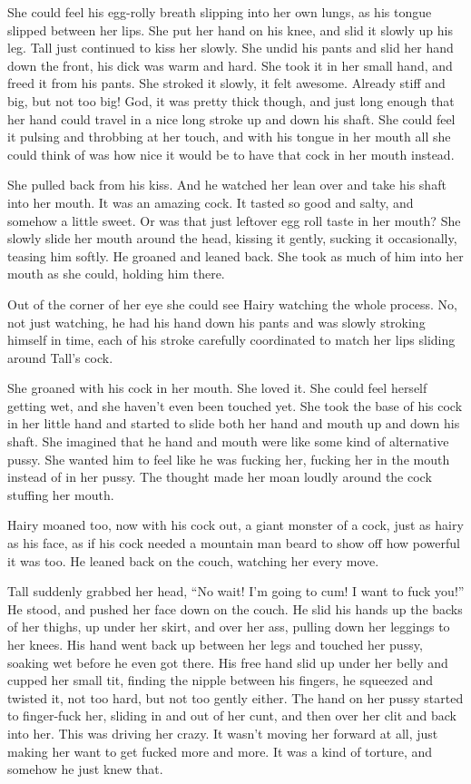 \documentclass[letterpaper]{article}
\begin{document}
\begin{multicols}{2}
She could feel his egg-rolly breath slipping into her own lungs, as his tongue slipped between her lips.
She put her hand on his knee, and slid it slowly up his leg.
Tall just continued to kiss her slowly.
She undid his pants and slid her hand down the front, his dick was warm and hard.
She took it in her small hand, and freed it from his pants.
She stroked it slowly, it felt awesome. Already stiff and big, but not too big!
God, it was pretty thick though, and just long enough that her hand could travel in a nice long stroke up and down his shaft.
She could feel it pulsing and throbbing at her touch, and with his tongue in her mouth all she could think of was how nice it would be to have that cock in her mouth instead.

She pulled back from his kiss.
And he watched her lean over and take his shaft into her mouth.
It was an amazing cock. It tasted so good and salty, and somehow a little sweet. Or was that just leftover egg roll taste in her mouth?
She slowly slide her mouth around the head, kissing it gently, sucking it occasionally, teasing him softly.
He groaned and leaned back.
She took as much of him into her mouth as she could, holding him there.

Out of the corner of her eye she could see Hairy watching the whole process.
No, not just watching, he had his hand down his pants and was slowly stroking himself in time, each of his stroke carefully coordinated to match her lips sliding around Tall's cock.

She groaned with his cock in her mouth. She loved it. She could feel herself getting wet, and she haven't even been touched yet. 
She took the base of his cock in her little hand and started to slide both her hand and mouth up and down his shaft. 
She imagined that he hand and mouth were like some kind of alternative pussy. 
She wanted him to feel like he was fucking her, fucking her in the mouth instead of in her pussy.
The thought made her moan loudly around the cock stuffing her mouth.

Hairy moaned too, now with his cock out, a giant monster of a cock, just as hairy as his face, as if his cock needed a mountain man beard to show off how powerful it was too. He leaned back on the couch, watching her every move.

Tall suddenly grabbed her head, ``No wait! I'm going to cum! I want to fuck you!''
He stood, and pushed her face down on the couch.
He slid his hands up the backs of her thighs, up under her skirt, and over her ass, pulling down her leggings to her knees.
His hand went back up between her legs and touched her pussy, soaking wet before he even got there.
His free hand slid up under her belly and cupped her small tit, finding the nipple between his fingers, he squeezed and twisted it, not too hard, but not too gently either.
The hand on her pussy started to finger-fuck her, sliding in and out of her cunt, and then over her clit and back into her.
This was driving her crazy.
It wasn't moving her forward at all, just making her want to get fucked more and more. It was a kind of torture, and somehow he just knew that.


\end{multicols}
\end{document}
